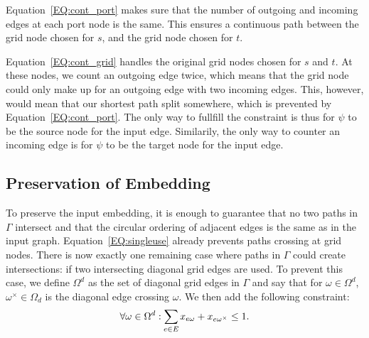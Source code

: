 \documentclass{sig-alternate-sigmod09}
\begin{document}
Equation~\ref{EQ:cont_port} makes sure that the number of outgoing and incoming edges at each port node is the same.
This ensures a continuous path between the grid node chosen for $s$, and the grid node chosen for $t$.

Equation~\ref{EQ:cont_grid} handles the original grid nodes chosen for $s$ and $t$.
At these nodes, we count an outgoing edge twice, which means that the grid node could only make up for an outgoing edge with two incoming edges.
This, however, would mean that our shortest path split somewhere, which is prevented by Equation~\ref{EQ:cont_port}.
The only way to fullfill the constraint is thus for $\psi$ to be the source node for the input edge.
Similarily, the only way to counter an incoming edge is for $\psi$ to be the target node for the input edge.

\subsection{Preservation of Embedding}

To preserve the input embedding, it is enough to guarantee that no two paths in $\Gamma$ intersect and that the circular ordering of adjacent edges is the same as in the input graph.
Equation~\ref{EQ:singleuse} already prevents paths crossing at grid nodes.
There is now exactly one remaining case where paths in $\Gamma$ could create intersections: if two intersecting diagonal grid edges are used.
To prevent this case, we define $\Omega^d$ as the set of diagonal grid edges in $\Gamma$ and say that for $\omega \in \Omega^d$, $\omega^{\times} \in \Omega_d$ is the diagonal edge crossing $\omega$. 
We then add the following constraint:
%
\begin{equation}
  \forall \omega \in \Omega^d: \Psum{e \in E} x_{e\omega} + x_{e\omega^{\times}} \leq 1. \label{EQ:crossing}
\end{equation}
\end{document}
